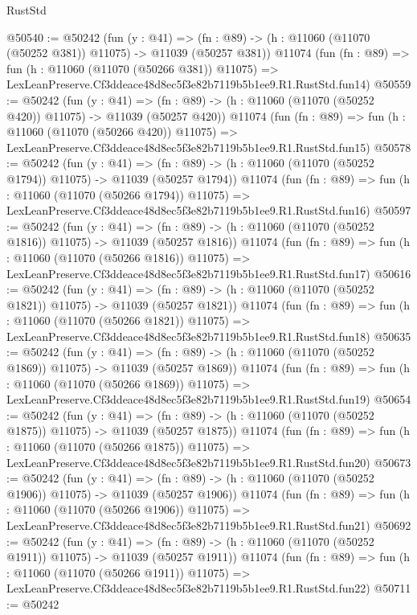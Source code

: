 \begin{lexlean}{RustStd}
\begin{coremodule}
@50540 := @50242
    (fun (y : @41) =>
    (fn : @89) -> (h : @11060 (@11070 (@50252 @381)) @11075) -> @11039 (@50257 @381))
    @11074
    (fun (fn : @89) =>
    fun (h : @11060 (@11070 (@50266 @381)) @11075) =>
    LexLeanPreserve.Cf3ddeace48d8ec5f3e82b7119b5b1ee9.R1.RustStd.fun14)
@50559 := @50242
    (fun (y : @41) =>
    (fn : @89) -> (h : @11060 (@11070 (@50252 @420)) @11075) -> @11039 (@50257 @420))
    @11074
    (fun (fn : @89) =>
    fun (h : @11060 (@11070 (@50266 @420)) @11075) =>
    LexLeanPreserve.Cf3ddeace48d8ec5f3e82b7119b5b1ee9.R1.RustStd.fun15)
@50578 := @50242
    (fun (y : @41) =>
    (fn : @89) -> (h : @11060 (@11070 (@50252 @1794)) @11075) -> @11039 (@50257 @1794))
    @11074
    (fun (fn : @89) =>
    fun (h : @11060 (@11070 (@50266 @1794)) @11075) =>
    LexLeanPreserve.Cf3ddeace48d8ec5f3e82b7119b5b1ee9.R1.RustStd.fun16)
@50597 := @50242
    (fun (y : @41) =>
    (fn : @89) -> (h : @11060 (@11070 (@50252 @1816)) @11075) -> @11039 (@50257 @1816))
    @11074
    (fun (fn : @89) =>
    fun (h : @11060 (@11070 (@50266 @1816)) @11075) =>
    LexLeanPreserve.Cf3ddeace48d8ec5f3e82b7119b5b1ee9.R1.RustStd.fun17)
@50616 := @50242
    (fun (y : @41) =>
    (fn : @89) -> (h : @11060 (@11070 (@50252 @1821)) @11075) -> @11039 (@50257 @1821))
    @11074
    (fun (fn : @89) =>
    fun (h : @11060 (@11070 (@50266 @1821)) @11075) =>
    LexLeanPreserve.Cf3ddeace48d8ec5f3e82b7119b5b1ee9.R1.RustStd.fun18)
@50635 := @50242
    (fun (y : @41) =>
    (fn : @89) -> (h : @11060 (@11070 (@50252 @1869)) @11075) -> @11039 (@50257 @1869))
    @11074
    (fun (fn : @89) =>
    fun (h : @11060 (@11070 (@50266 @1869)) @11075) =>
    LexLeanPreserve.Cf3ddeace48d8ec5f3e82b7119b5b1ee9.R1.RustStd.fun19)
@50654 := @50242
    (fun (y : @41) =>
    (fn : @89) -> (h : @11060 (@11070 (@50252 @1875)) @11075) -> @11039 (@50257 @1875))
    @11074
    (fun (fn : @89) =>
    fun (h : @11060 (@11070 (@50266 @1875)) @11075) =>
    LexLeanPreserve.Cf3ddeace48d8ec5f3e82b7119b5b1ee9.R1.RustStd.fun20)
@50673 := @50242
    (fun (y : @41) =>
    (fn : @89) -> (h : @11060 (@11070 (@50252 @1906)) @11075) -> @11039 (@50257 @1906))
    @11074
    (fun (fn : @89) =>
    fun (h : @11060 (@11070 (@50266 @1906)) @11075) =>
    LexLeanPreserve.Cf3ddeace48d8ec5f3e82b7119b5b1ee9.R1.RustStd.fun21)
@50692 := @50242
    (fun (y : @41) =>
    (fn : @89) -> (h : @11060 (@11070 (@50252 @1911)) @11075) -> @11039 (@50257 @1911))
    @11074
    (fun (fn : @89) =>
    fun (h : @11060 (@11070 (@50266 @1911)) @11075) =>
    LexLeanPreserve.Cf3ddeace48d8ec5f3e82b7119b5b1ee9.R1.RustStd.fun22)
@50711 := @50242

\end{coremodule}
\end{lexlean}

